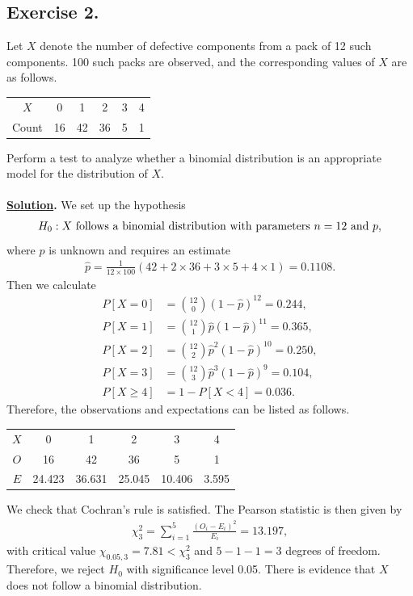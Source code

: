 \subsection*{Exercise 2.}

Let $X$ denote the number of defective components from a pack of 12 such components. 100 such packs are observed, and the corresponding values of $X$ are as follows.
\begin{table}[H]
	\centering
	\begin{tabular}{c|ccccc}
		$X$ & 0 & 1 & 2 & 3 & 4 \\
		Count & 16 & 42 & 36 & 5 & 1
	\end{tabular}
\end{table}
Perform a test to analyze whether a binomial distribution is an appropriate model for the distribution of $X$. \\
~\\
\textbf{\underline{Solution}.} We set up the hypothesis
\begin{align*}
H_0: X \mathrm{\ follows\ a\ binomial\ distribution\ with\ parameters\ } n = 12 \mathrm{\ and\ } p,
\end{align*}
where $p$ is unknown and requires an estimate
\begin{align*}
\widehat{p} = \frac{1}{12\times 100}(42 + 2\times 36 + 3\times 5 + 4\times 1) = 0.1108.
\end{align*}
Then we calculate
\begin{align*}
P[X = 0] & = \binom{12}{0}(1-\widehat{p})^{12} = 0.244, \\
P[X = 1] & = \binom{12}{1}\widehat{p}(1-\widehat{p})^{11} = 0.365, \\
P[X = 2] & = \binom{12}{2}\widehat{p}^2(1-\widehat{p})^{10} = 0.250, \\
P[X = 3] & = \binom{12}{3}\widehat{p}^3(1-\widehat{p})^{9} = 0.104, \\
P[X \geq 4] & = 1 - P[X<4] = 0.036.
\end{align*}
Therefore, the observations and expectations can be listed as follows.
\begin{table}[H]
	\centering
	\begin{tabular}{c|ccccc}
		$X$ & 0 & 1 & 2 & 3 & 4 \\
		$O$ & 16 & 42 & 36 & 5 & 1 \\
		$E$ & 24.423 & 36.631 & 25.045 & 10.406 & 3.595
	\end{tabular}
\end{table}
We check that Cochran's rule is satisfied. The Pearson statistic is then given by
\begin{align*}
\chi_{3}^2 = \sum_{i=1}^5 \frac{(O_i - E_i)^2}{E_i} = 13.197,
\end{align*}
with critical value $\chi_{0.05,3} = 7.81 < \chi_{3}^2$ and $5 - 1 - 1 = 3$ degrees of freedom. Therefore, we reject $H_0$ with significance level 0.05. There is evidence that $X$ does not follow a binomial distribution.

